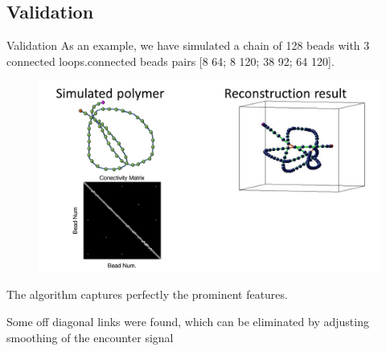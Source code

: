 \documentclass[8pt]{beamer}
\begin{document}
\subsection{Validation}
\begin{frame}{Validation}
As an example, we have simulated a  chain of 128 beads with 3 connected loops.connected beads pairs [8 64; 8 120; 38 92; 64 120]. 
\begin{figure}
\includegraphics[scale=0.25]{reconstructionResultCompositeStructure}
\end{figure}
The algorithm captures perfectly the prominent features. 

Some off diagonal links were found, which can be eliminated by adjusting smoothing of the encounter signal 

\end{frame}
\end{document}
